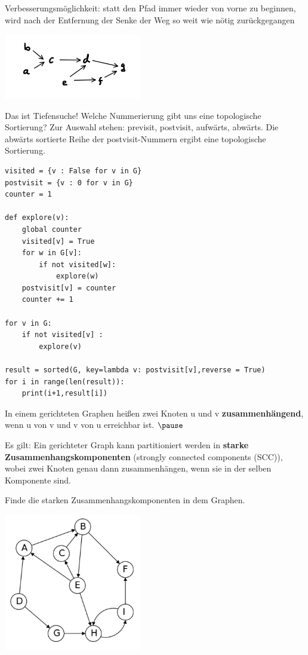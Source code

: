 \begin{frame}[fragile] 

Verbesserungsmöglichkeit: statt den Pfad immer wieder von vorne zu beginnen, wird nach der
Entfernung der Senke der Weg so weit wie nötig zurückgegangen 

\includegraphics[width=6cm]{bild12.png}   \pause

Das ist Tiefensuche! 
Welche Nummerierung gibt uns eine topologische Sortierung? Zur Auswahl stehen:
previsit, postvisit, aufwärts, abwärts.  \pause
Die abwärts sortierte Reihe der postvisit-Nummern ergibt eine topologische Sortierung.
\end{frame}

\begin{frame}[fragile] 
\begin{lstlisting} 
visited = {v : False for v in G}  
postvisit = {v : 0 for v in G}     
counter = 1  

def explore(v):
    global counter
    visited[v] = True
    for w in G[v]:
        if not visited[w]:
            explore(w)
    postvisit[v] = counter
    counter += 1

for v in G:
    if not visited[v] :
        explore(v) 

result = sorted(G, key=lambda v: postvisit[v],reverse = True)
for i in range(len(result)):
    print(i+1,result[i])   
\end{lstlisting} 
\end{frame}

\begin{frame}[fragile] 
In einem gerichteten Graphen heißen zwei Knoten u und v \textbf{zusammenhängend}, wenn u von v und v von u erreichbar ist.  $\pause$         

Es gilt: Ein gerichteter Graph kann partitioniert werden in \textbf{starke Zusammenhangskomponenten} (strongly connected components (SCC)), wobei zwei Knoten genau dann zusammenhängen, wenn sie in der selben Komponente sind.
\end{frame}

\begin{frame}[fragile] 
Finde die starken Zusammenhangskomponenten in dem Graphen.

\includegraphics[width=6cm]{bild13.png}
\end{frame}


